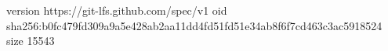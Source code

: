 version https://git-lfs.github.com/spec/v1
oid sha256:b0fc479fd309a9a5e428ab2aa11dd4fd51fd51e34ab8f6f7cd463c3ac5918524
size 15543
